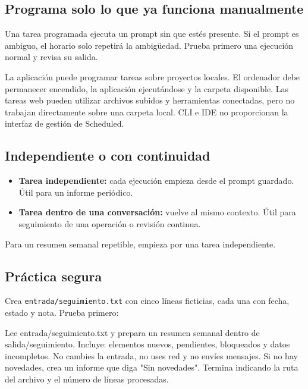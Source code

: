 \documentclass[10pt,a4paper,openany]{book}
\providecommand{\tightlist}{\setlength{\itemsep}{0.18em}\setlength{\parskip}{0pt}}
\newenvironment{Shaded}{}{}
\newcommand{\NormalTok}[1]{#1}
\renewenvironment{Shaded}
  {\begin{tcolorbox}[
    enhanced,
    breakable,
    colback=CodeBg,
    colframe=Border,
    boxrule=0.5pt,
    arc=2mm,
    left=3mm,
    right=3mm,
    top=2.2mm,
    bottom=2.2mm,
    before skip=0.8em,
    after skip=0.9em
  ]}
  {\end{tcolorbox}}
\begin{document}
\subsection{Programa solo lo que ya funciona
manualmente}\label{programa-solo-lo-que-ya-funciona-manualmente}

Una tarea programada ejecuta un prompt sin que estés presente. Si el
prompt es ambiguo, el horario solo repetirá la ambigüedad. Prueba
primero una ejecución normal y revisa su salida.

La aplicación puede programar tareas sobre proyectos locales. El
ordenador debe permanecer encendido, la aplicación ejecutándose y la
carpeta disponible. Las tareas web pueden utilizar archivos subidos y
herramientas conectadas, pero no trabajan directamente sobre una carpeta
local. CLI e IDE no proporcionan la interfaz de gestión de Scheduled.

\subsection{Independiente o con
continuidad}\label{independiente-o-con-continuidad}

\begin{itemize}
\tightlist
\item
  \textbf{Tarea independiente:} cada ejecución empieza desde el prompt
  guardado. Útil para un informe periódico.
\item
  \textbf{Tarea dentro de una conversación:} vuelve al mismo contexto.
  Útil para seguimiento de una operación o revisión continua.
\end{itemize}

Para un resumen semanal repetible, empieza por una tarea independiente.

\subsection{Práctica segura}\label{pruxe1ctica-segura}

Crea \texttt{entrada/seguimiento.txt} con cinco líneas ficticias, cada
una con fecha, estado y nota. Prueba primero:

\begin{Shaded}
\begin{Highlighting}[]
\NormalTok{Lee entrada/seguimiento.txt y prepara un resumen semanal dentro de}
\NormalTok{salida/seguimiento. Incluye: elementos nuevos, pendientes, bloqueados y datos}
\NormalTok{incompletos. No cambies la entrada, no uses red y no envíes mensajes. Si no hay}
\NormalTok{novedades, crea un informe que diga "Sin novedades". Termina indicando la ruta}
\NormalTok{del archivo y el número de líneas procesadas.}
\end{Highlighting}
\end{Shaded}
\end{document}
